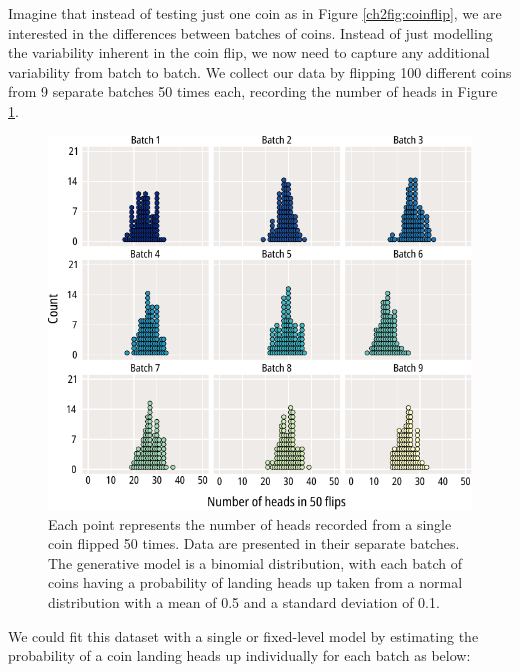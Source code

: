 Imagine that instead of testing just one coin as in Figure \ref{ch2fig:coinflip}, we are interested in the differences between batches of coins.
Instead of just modelling the variability inherent in the coin flip, we now need to capture any additional variability from batch to batch.
We collect our data by flipping 100 different coins from 9 separate batches 50 times each, recording the number of heads in Figure \ref{ch2fig:mixed_1}.

\begin{figure}
	\centering
	\includegraphics[width=\textwidth]{coinflip_mixed_1.pdf}
	\caption[Multilevel modelling of coinflips]{
		{\bf{}}
		Each point represents the number of heads recorded from a single coin flipped 50 times.
		Data are presented in their separate batches.
		The generative model is a binomial distribution, with each batch of coins having a probability of landing heads up taken from a normal distribution with a mean of 0.5 and a standard deviation of 0.1.
	}\label{ch2fig:mixed_1}
\end{figure}

We could fit this dataset with a single or fixed-level model by estimating the probability of a coin landing heads up individually for each batch as below:

